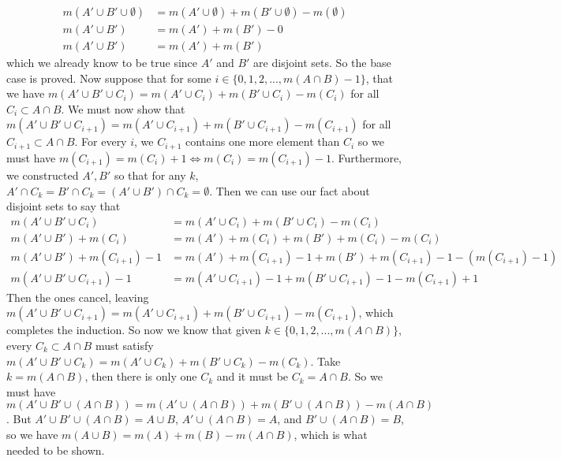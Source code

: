\documentclass[11pt]{article}
\begin{document}
\begin{exercise}{7}{14}
{\begin{align*}
            m(A' \cup B' \cup \emptyset) &= m(A' \cup \emptyset) + m(B' \cup \emptyset) - m(\emptyset) \\
            m(A' \cup B') &= m(A') + m(B') - 0 \\
            m(A' \cup B') &= m(A') + m(B')
        \end{align*}
        which we already know to be true since $A'$ and $B'$ are disjoint sets.
        So the base case is proved. \parspace
        Now suppose that for some $i \in \{ 0, 1, 2, ..., m(A \cap B) - 1 \}$, that we have $m(A' \cup B' \cup C_i) = m(A' \cup C_i) + m(B' \cup C_i) - m(C_i)$ for all $C_i \subset A \cap B$.
        We must now show that $m(A' \cup B' \cup C_{i+1}) = m(A' \cup C_{i+1}) + m(B' \cup C_{i+1}) - m(C_{i+1})$ for all $C_{i+1} \subset A \cap B$. \parspace
        For every $i$, we $C_{i+1}$ contains one more element than $C_i$ so we must have $m(C_{i+1}) = m(C_i) + 1 \iff m(C_i) = m(C_{i+1}) - 1$.
        Furthermore, we constructed $A', B'$ so that for any $k$, $A' \cap C_k = B' \cap C_k = (A' \cup B') \cap C_k = \emptyset$.
        Then we can use our fact about disjoint sets to say that
        \begin{align*}
            m(A' \cup B' \cup C_i) &= m(A' \cup C_i) + m(B' \cup C_i) - m(C_i) \\
            m(A' \cup B') + m(C_i) &= m(A') + m(C_i) + m(B') + m(C_i) - m(C_i) \\
            m(A' \cup B') + m(C_{i+1}) - 1 &= m(A') + m(C_{i+1}) - 1 + m(B') + m(C_{i+1}) - 1 - (m(C_{i+1}) - 1) \\
            m(A' \cup B' \cup C_{i+1}) - 1 &= m(A' \cup C_{i+1}) - 1 + m(B' \cup C_{i+1}) - 1 - m(C_{i+1}) + 1
        \end{align*}
        Then the ones cancel, leaving $m(A' \cup B' \cup C_{i+1}) = m(A' \cup C_{i+1}) + m(B' \cup C_{i+1}) - m(C_{i+1})$, which completes the induction. \parspace
        So now we know that given $k \in \{ 0, 1, 2, ..., m(A \cap B) \}$, every $C_k \subset A \cap B$ must satisfy $m(A' \cup B' \cup C_k) = m(A' \cup C_k) + m(B' \cup C_k) - m(C_k)$.
        Take $k = m(A \cap B) $, then there is only one $C_k$ and it must be $C_k = A \cap B$.
        So we must have $ m(A' \cup B' \cup (A \cap B)) = m(A' \cup (A \cap B)) +m (B' \cup (A \cap B)) - m(A \cap B)$.
        But $A' \cup B' \cup (A \cap B) = A \cup B$, $A' \cup (A \cap B) = A$, and $B' \cup (A \cap B) = B$, so we have $m(A \cup B) = m(A) + m(B) - m(A \cap B)$, which is what needed to be shown.
    }
\end{exercise}
\end{document}
